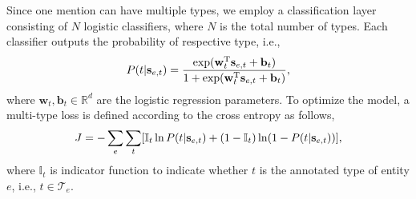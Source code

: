 \documentclass[letterpaper]{article} %
\begin{document}
Since one mention can have multiple types, we employ a classification layer consisting of $N$ logistic classifiers, where $N$ is the total number of types. Each classifier outputs the probability of respective type, i.e., 
\vspace{-4pt}
\[
P(t|\mathbf{s}_{e,t})=\frac{\exp(\mathbf{w}_{t}^\mathrm{T} \mathbf{s}_{e,t}+\mathbf{b}_{t})}{1+\exp(\mathbf{w}_{t}^\mathrm{T} \mathbf{s}_{e,t}+\mathbf{b}_{t})},
\vspace{-4pt}
\]
where $\mathbf{w}_{t}, \mathbf{b}_{t}  \in \mathbb{R}^{d}$ are the logistic regression parameters. %
To optimize the model, a multi-type loss is defined according to the cross entropy as follows,
\vspace{-4pt}
\[
J=-\sum_{e} \sum_{t} [\mathbb{I}_{t}\ln P(t|\mathbf{s}_{e,t})+(1-\mathbb{I}_{t})\ln(1-P(t|\mathbf{s}_{e,t}))],
\vspace{-4pt}
\]
where $\mathbb{I}_t$ is indicator function to indicate whether $t$ is the annotated type of entity $e$, i.e., $t\in \mathcal{T}_e$. 
\end{document}
